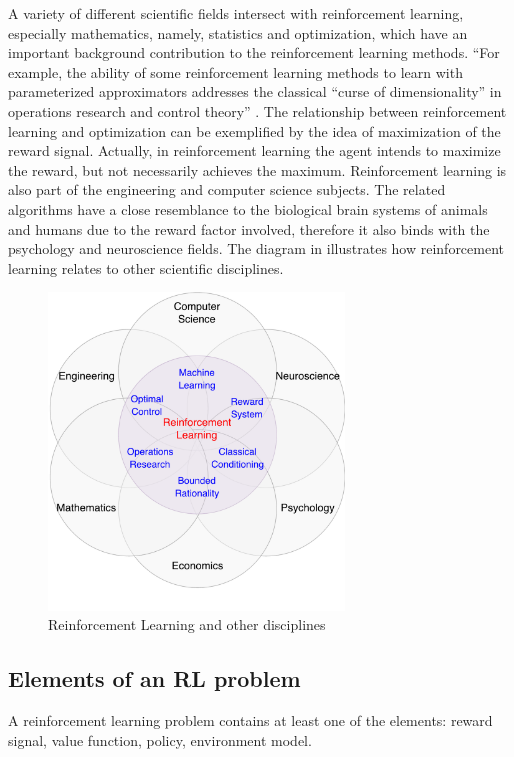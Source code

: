 A variety of different scientific fields intersect with reinforcement learning, especially mathematics, namely, statistics and optimization, which have an important background contribution to the reinforcement learning methods. “For example, the ability of some reinforcement learning methods to learn with parameterized approximators addresses the classical “curse of dimensionality” in operations research and control theory” \cite{Sutton}. The relationship between reinforcement learning and optimization can be exemplified by the idea of maximization of the reward signal. Actually, in reinforcement learning the agent intends to maximize the reward, but not necessarily achieves the maximum. Reinforcement learning is also part of the engineering and computer science subjects. The related algorithms have a close resemblance to the biological brain systems of animals and humans due to the reward factor involved, therefore it also binds with the psychology and neuroscience fields. The diagram in  illustrates how reinforcement learning relates to other scientific disciplines.
\begin{figure}[H]
	\centering
	\includegraphics[width=0.7\textwidth]{Figures/RLandOther}
	\caption{Reinforcement Learning and other disciplines}
	\label{fig:RLandOther}
\end{figure}
\subsection{Elements of an RL problem}
A reinforcement learning problem contains at least one of the elements: reward signal, value function, policy, environment model.

